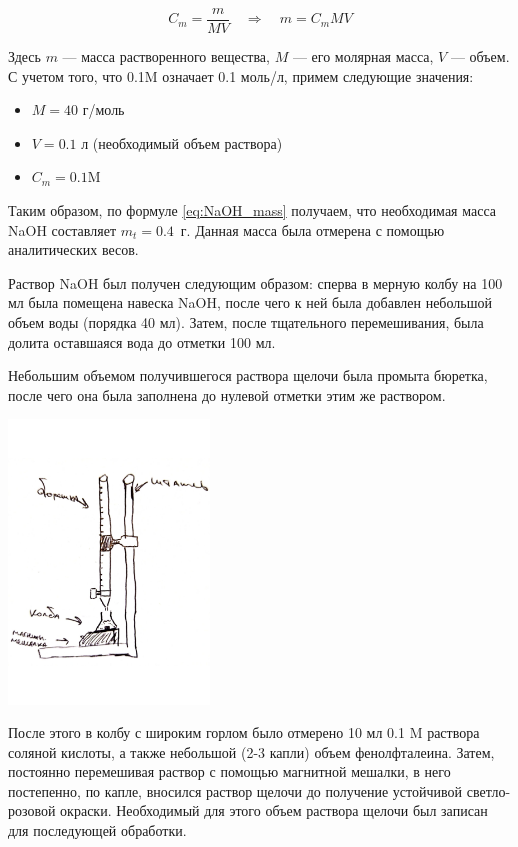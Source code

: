 \documentclass[a4paper, 12pt]{article}
\newcommand{\qrq}
{\ensuremath{\quad \Rightarrow \quad}} %
\begin{document}
\begin{equation}
C_m = \frac{m}{M V} \qrq m = C_m M V
\label{eq:NaOH_mass}
\end{equation}

Здесь $m$ --- масса растворенного вещества, $M$ --- его молярная масса, $V$ --- объем. С учетом того, что 0.1M означает 0.1 моль/л, примем следующие значения:

\begin{itemize}
	\item $M = 40$ г/моль 
	
	\item $V = 0.1$ л (необходимый объем раствора)
	
	\item $C_m = 0.1 \text{M}$
\end{itemize}

Таким образом, по формуле \ref{eq:NaOH_mass} получаем, что необходимая масса NaOH составляет $m_t = 0.4$~г. Данная масса была отмерена с помощью аналитических весов.

Раствор NaOH был получен следующим образом: сперва в мерную колбу на 100 мл была помещена навеска NaOH, после чего к ней была добавлен небольшой объем воды (порядка 40 мл). Затем, после тщательного перемешивания, была долита оставшаяся вода до отметки 100 мл.

Небольшим объемом получившегося раствора щелочи была промыта бюретка, после чего она была заполнена до нулевой отметки этим же раствором.

\begin{center}
	\includegraphics[width = 0.4\textwidth]{byuretka}
\end{center}

После этого в колбу с широким горлом было отмерено 10 мл 0.1 M раствора соляной кислоты, а также небольшой (2-3 капли) объем фенолфталеина. Затем, постоянно перемешивая раствор с помощью магнитной мешалки, в него постепенно, по капле, вносился раствор щелочи до получение устойчивой светло-розовой окраски. Необходимый для этого объем раствора щелочи был записан для последующей обработки. 
\end{document}
